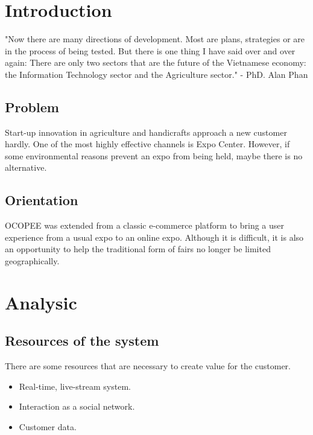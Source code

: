 \documentclass{article}
\begin{document}
	\pagebreak
	\newpage
	\setcounter{page}{1}
	\newpage
	\tableofcontents
	\listoffigures
	


\newpage
{}


	\section{Introduction}
	"Now there are many directions of development. Most are plans, strategies or are in the process of being tested. But there is one thing I have said over and over again: There are only two sectors that are the future of the Vietnamese economy: the Information Technology sector and the Agriculture sector." - PhD. Alan Phan
	\subsection{Problem}
	Start-up innovation in agriculture and handicrafts approach a new customer hardly. 
	One of the most highly effective channels is Expo Center.
	However, if some environmental reasons prevent an expo from being held, maybe there is no alternative.
	\subsection{Orientation}
	OCOPEE was extended from a classic e-commerce platform to bring a user experience from a usual expo to an online expo. Although it is difficult, it is also an opportunity to help the traditional form of fairs no longer be limited geographically.
	\section{Analysic}
	\subsection{Resources of the system}
	There are some resources that are necessary to create value for the customer.
	\begin{itemize}
		\item Real-time, live-stream system.
		\item Interaction as a social network.
		\item Customer data.
	\end{itemize}
\end{document}
